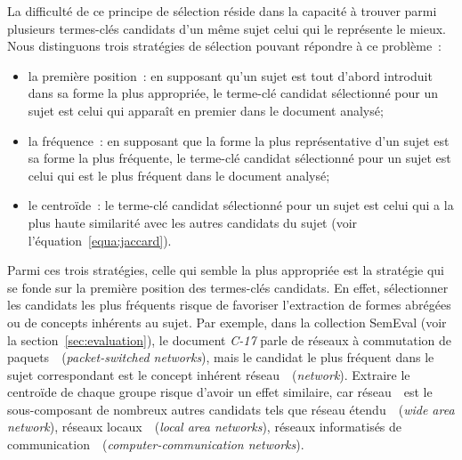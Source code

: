     La difficulté de ce principe de sélection réside dans la capacité à trouver
    parmi plusieurs termes-clés candidats d'un même sujet celui qui le
    représente le mieux. Nous distinguons trois stratégies de sélection pouvant
    répondre à ce problème~:
    \begin{itemize}
      \item{la première position~: en supposant qu'un sujet est tout d'abord
            introduit dans sa forme la plus appropriée, le terme-clé candidat
            sélectionné pour un sujet est celui qui apparaît en premier dans le
            document analysé;}
      \item{la fréquence~: en supposant que la forme la plus représentative d'un
            sujet est sa forme la plus fréquente, le terme-clé candidat
            sélectionné pour un sujet est celui qui est le plus fréquent dans le
            document analysé;}
      \item{le centroïde~: le terme-clé candidat sélectionné pour un sujet est
            celui qui a la plus haute similarité avec les autres candidats du
            sujet (voir l'équation~\ref{equa:jaccard}).}
    \end{itemize}
    Parmi ces trois stratégies, celle qui semble la plus appropriée est la
    stratégie qui se fonde sur la première position des termes-clés candidats.
    En effet, sélectionner les candidats les plus fréquents risque de favoriser
    l'extraction de formes abrégées ou de concepts inhérents au sujet. Par
    exemple, dans la collection SemEval (voir la section~\ref{sec:evaluation}),
    le document \textit{C-17} parle de \og réseaux à commutation de
    paquets~\fg\ (\textit{packet-switched networks}), mais le candidat le plus
    fréquent dans le sujet correspondant est le concept inhérent
    \og réseau~\fg\ (\textit{network}). Extraire le centroïde de chaque groupe
    risque d'avoir un effet similaire, car \og réseau~\fg\ est le sous-composant
    de nombreux autres candidats tels que \og réseau étendu~\fg\ (\textit{wide
    area network}), \og réseaux locaux~\fg\ (\textit{local area networks}),
    \og réseaux informatisés de
    communication~\fg\ (\textit{computer-communication networks}).

